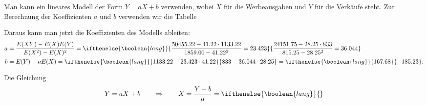 \begin{loesung}
\begin{teilaufgaben}
\item
Man kann ein lineares Modell der Form $Y=aX+b$ verwenden, wobei $X$
für die Werbeausgaben und $Y$ für die Verkäufe steht.
Zur Berechnung der Koeffizienten $a$ und $b$ verwenden wir die Tabelle
\begin{center}
\def\p{\phantom{.00}}
\end{center}
Daraus kann man jetzt die Koeffizienten des Modells ableiten:
\begin{align*}
a
&=
\frac{E(XY)-E(X)E(Y)}{E(X^2)-E(X)^2}
=
\ifthenelse{\boolean{lang}}{
\frac{50455.22 - 41.22 \cdot 1133.22}{1859.00 - 41.22^2} = 23.423
}{
\frac{24151.75 - 28.25 \cdot 833}{815.25 - 28.25^2} = 36.044
}
\\
b
&=
E(Y) - aE(X)
=
\ifthenelse{\boolean{lang}}{
1133.22 - 23.423 \cdot 41.22
}{
833 - 36.044 \cdot 28.25
}
=
\ifthenelse{\boolean{lang}}{
167.68
}{
-185.23
}.
\end{align*}
\item
Die Gleichung
\[
Y=aX +b 
\qquad\Rightarrow\qquad
X
=
\frac{Y-b}{a}
=
\ifthenelse{\boolean{lang}}{
}\]
\end{teilaufgaben}
\end{loesung}
